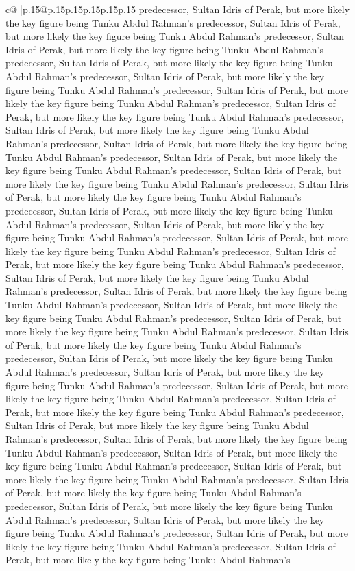 \documentclass{article}
\begin{document}
{\begin{supertabular}{c@{$\;$}|p{.15\linewidth}@{}p{.15\linewidth}p{.15\linewidth}p{.15\linewidth}p{.15\linewidth}p{.15\linewidth}}
{{{predecessor, Sultan Idris of Perak, but more likely the key figure being Tunku Abdul Rahman's predecessor, Sultan Idris of Perak, but more likely the key figure being Tunku Abdul Rahman's predecessor, Sultan Idris of Perak, but more likely the key figure being Tunku Abdul Rahman's predecessor, Sultan Idris of Perak, but more likely the key figure being Tunku Abdul Rahman's predecessor, Sultan Idris of Perak, but more likely the key figure being Tunku Abdul Rahman's predecessor, Sultan Idris of Perak, but more likely the key figure being Tunku Abdul Rahman's predecessor, Sultan Idris of Perak, but more likely the key figure being Tunku Abdul Rahman's predecessor, Sultan Idris of Perak, but more likely the key figure being Tunku Abdul Rahman's predecessor, Sultan Idris of Perak, but more likely the key figure being Tunku Abdul Rahman's predecessor, Sultan Idris of Perak, but more likely the key figure being Tunku Abdul Rahman's predecessor, Sultan Idris of Perak, but more likely the key figure being Tunku Abdul Rahman's predecessor, Sultan Idris of Perak, but more likely the key figure being Tunku Abdul Rahman's predecessor, Sultan Idris of Perak, but more likely the key figure being Tunku Abdul Rahman's predecessor, Sultan Idris of Perak, but more likely the key figure being Tunku Abdul Rahman's predecessor, Sultan Idris of Perak, but more likely the key figure being Tunku Abdul Rahman's predecessor, Sultan Idris of Perak, but more likely the key figure being Tunku Abdul Rahman's predecessor, Sultan Idris of Perak, but more likely the key figure being Tunku Abdul Rahman's predecessor, Sultan Idris of Perak, but more likely the key figure being Tunku Abdul Rahman's predecessor, Sultan Idris of Perak, but more likely the key figure being Tunku Abdul Rahman's predecessor, Sultan Idris of Perak, but more likely the key figure being Tunku Abdul Rahman's predecessor, Sultan Idris of Perak, but more likely the key figure being Tunku Abdul Rahman's predecessor, Sultan Idris of Perak, but more likely the key figure being Tunku Abdul Rahman's predecessor, Sultan Idris of Perak, but more likely the key figure being Tunku Abdul Rahman's predecessor, Sultan Idris of Perak, but more likely the key figure being Tunku Abdul Rahman's predecessor, Sultan Idris of Perak, but more likely the key figure being Tunku Abdul Rahman's predecessor, Sultan Idris of Perak, but more likely the key figure being Tunku Abdul Rahman's predecessor, Sultan Idris of Perak, but more likely the key figure being Tunku Abdul Rahman's predecessor, Sultan Idris of Perak, but more likely the key figure being Tunku Abdul Rahman's predecessor, Sultan Idris of Perak, but more likely the key figure being Tunku Abdul Rahman's predecessor, Sultan Idris of Perak, but more likely the key figure being Tunku Abdul Rahman's predecessor, Sultan Idris of Perak, but more likely the key figure being Tunku Abdul Rahman's predecessor, Sultan Idris of Perak, but more likely the key figure being Tunku Abdul Rahman's predecessor, Sultan Idris of Perak, but more likely the key figure being Tunku Abdul Rahman's predecessor, Sultan Idris of Perak, but more likely the key figure being Tunku Abdul Rahman's }}}
\end{supertabular}}
\end{document}
